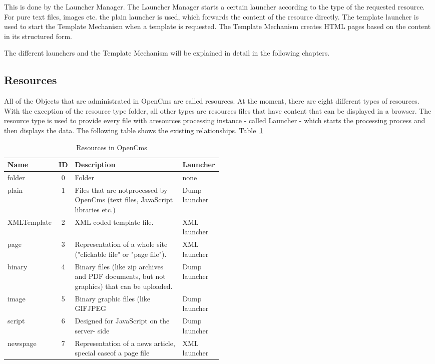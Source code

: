This is done by the {\name Launcher Manager}. The {\name Launcher Manager} starts a
certain launcher according to the type of the requested resource. For
pure text files, images etc. the plain launcher is used, which forwards
the content of the resource directly. The {\name template launcher} is used to
start the Template Mechanism when a template is requested. The {\name Template
Mechanism} creates HTML pages based on the content in its structured form.

The different launchers and the {\name Template Mechanism} will be explained in
detail in the following chapters.
\newpage

\subsection{Resources}
All of the Objects that are administrated in OpenCms are called
{\name resources}. At the moment, there are eight different types of
resources. With the exception of the resource type {\name folder,} all other
types are resources files that have content that can be displayed in a
browser. The  resource type is used to provide every file with aresources
processing instance - called {\name Launcher} - which starts the processing
process and then displays the data. The following table shows the
existing relationships. {Table~\ref {resources}}
\begin{table}[h]
\begin{center}
\begin{tabular}{|l|c|p{0.50\linewidth}|l|}
\hline
{\bf Name}& 
{\bf ID}& 
{\bf Description}& 
{\bf Launcher}\\ \hline
folder&
0& Folder&none\\ \hline
plain&
1&
Files that are notprocessed by OpenCms (text files, JavaScript libraries etc.)&
Dump launcher\\ \hline
XMLTemplate&
2&
XML coded template file.&
XML launcher\\ \hline
page&
3&
Representation of a whole site ("clickable file" or "page file").&
XML launcher\\ \hline
binary&
4& 
Binary files (like zip archives and PDF documents, but not graphics) that can be uploaded.&
Dump launcher\\ \hline
image& 
5& 
Binary graphic files (like  GIFJPEG& 
Dump launcher\\ \hline
script& 
6& 
Designed for JavaScript on the server- side& 
Dump launcher\\ \hline
newspage&
7& 
Representation of a news article, special caseof a page file& 
XML launcher\\ \hline 
\end{tabular}
\caption [Resources in OpenCms]{Resources in OpenCms}
\end{center}
\label{resources}
\end{table}


